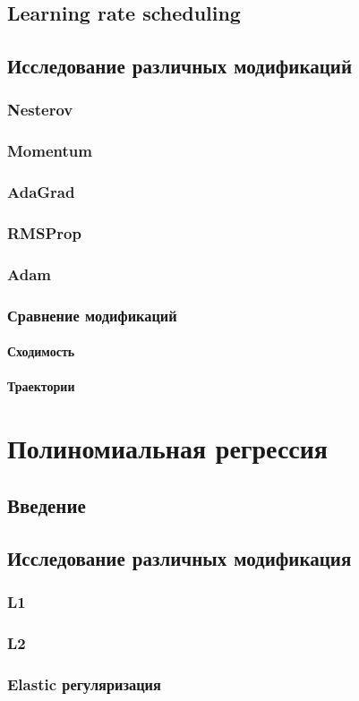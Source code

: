 \documentclass[12pt, a4paper, oneside, final]{article}
\begin{document}
	\subsection*{Learning rate scheduling}
	\subsection*{Исследование различных модификаций}
	\subsubsection*{Nesterov}
	\subsubsection*{Momentum}
	\subsubsection*{AdaGrad}
	\subsubsection*{RMSProp}
	\subsubsection*{Adam}
	\subsubsection*{Сравнение модификаций}
	\paragraph{Сходимость}
	\paragraph{Траектории}
	\newpage
	\section*{Полиномиальная регрессия}
	\subsection*{Введение}
	\subsection*{Исследование различных модификация}
	\subsubsection*{L1}
	\subsubsection*{L2}
	\subsubsection*{Elastic регуляризация}
\end{document}

